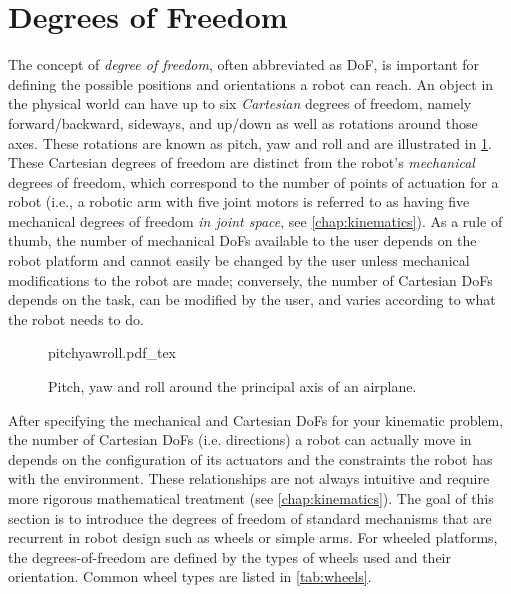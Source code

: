 \section{Degrees of Freedom}\label{sec:dof}

The concept of \textsl{degree of freedom}, often abbreviated as DoF, is important for defining the possible positions and orientations a robot can reach. An object in the physical world can have up to six \textsl{Cartesian} degrees of freedom, namely forward/backward, sideways, and up/down as well as rotations around those axes. These rotations are known as pitch, yaw and roll and are illustrated in \cref{fig:pitchyawandroll}. These Cartesian degrees of freedom are distinct from the robot's \textsl{mechanical} degrees of freedom, which correspond to the number of points of actuation for a robot (i.e., a robotic arm with five joint motors is referred to as having five mechanical degrees of freedom \textsl{in joint space}, see \cref{chap:kinematics}).
As a rule of thumb, the number of mechanical DoFs available to the user depends on the robot platform and cannot easily be changed by the user unless mechanical modifications to the robot are made; conversely, the number of Cartesian DoFs depends on the task, can be modified by the user, and varies according to what the robot needs to do.

\begin{figure}
    \centering
    \def\svgwidth{\textwidth}
    {pitchyawroll.pdf_tex}
    \caption{Pitch, yaw and roll around the principal axis of an airplane.}
    \label{fig:pitchyawandroll}
\end{figure}

After specifying the mechanical and Cartesian DoFs for your kinematic problem, the number of Cartesian DoFs (i.e. directions) a robot can actually move in depends on the configuration of its actuators and the constraints the robot has with the environment. These relationships are not always intuitive and require more rigorous mathematical treatment (see \cref{chap:kinematics}). The goal of this section is to introduce the degrees of freedom of standard mechanisms that are recurrent in robot design such as wheels or simple arms. For wheeled platforms, the degrees-of-freedom are defined by the types of wheels used and their orientation. Common wheel types are listed in \cref{tab:wheels}.

